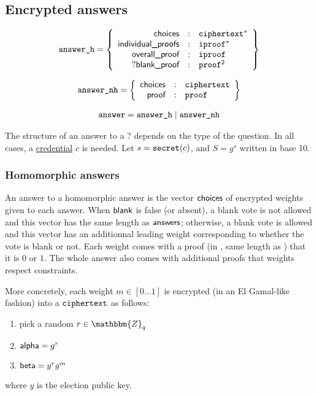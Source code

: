 \documentclass[a4paper]{article}
\newcommand{\Z}{\mathbbm{Z}}
\begin{document}
\subsection{Encrypted answers}
\label{answers}

\begin{gather*}
  \texttt{answer\_h}=\left\{
    \begin{array}{rcl}
      \textsf{choices}&:&\texttt{ciphertext}^\ast\\
      \textsf{individual\_proofs}&:&\texttt{iproof}^\ast\\
      \textsf{overall\_proof}&:&\texttt{iproof}\\
      ?\textsf{blank\_proof}&:&\texttt{proof}^2
    \end{array}
  \right\}
\end{gather*}

\begin{gather*}
  \texttt{answer\_nh}=\left\{
    \begin{array}{rcl}
      \textsf{choices}&:&\texttt{ciphertext}\\
      \textsf{proof}&:&\texttt{proof}
    \end{array}
  \right\}
\end{gather*}

\begin{gather*}
  \texttt{answer}=\texttt{answer\_h}\mid\texttt{answer\_nh}
\end{gather*}

The structure of an answer to a \hyperref[elections]{$\question$}
depends on the type of the question. In all cases, a
\hyperref[credentials]{credential} $c$ is needed. Let $s=\texttt{secret}(c)$,
and $S=g^s$ written in base 10.

\subsubsection{Homomorphic answers}

An answer to a homomorphic answer is the vector
$\textsf{choices}$ of encrypted weights given to each answer. When $\textsf{blank}$ is
false (or absent), a blank vote is not allowed and this vector has the
same length as $\textsf{answers}$; otherwise, a blank vote is allowed and this
vector has an additionnal leading weight corresponding to whether the
vote is blank or not.  Each weight comes with a proof (in \iproofs,
same length as \choices) that it is $0$ or $1$. The whole answer also
comes with additional proofs that weights respect constraints.

More concretely, each weight $m\in[0\dots1]$ is encrypted (in an El
Gamal-like fashion) into a $\texttt{ciphertext}$ as follows:
\begin{enumerate}
\item pick a random $r\in\Z_q$
\item $\textsf{alpha}=g^r$
\item $\textsf{beta}=y^rg^m$
\end{enumerate}
where $y$ is the election public key.
\end{document}
